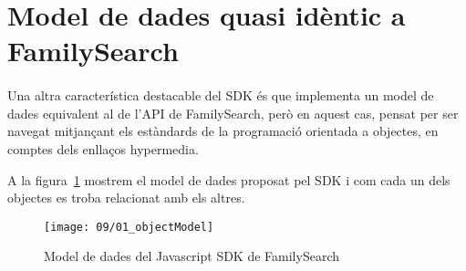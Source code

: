 \section{Model de dades quasi idèntic a FamilySearch}

    \paragraph{}
    Una altra característica destacable del SDK és que implementa un model de dades equivalent al de l’API de FamilySearch, però en aquest cas, pensat per ser navegat mitjançant els estàndards de la programació orientada a objectes, en comptes dels enllaços hypermedia.

    A la figura~\ref{fig:sdkDataModel} mostrem el model de dades proposat pel SDK i com cada un dels objectes es troba relacionat amb els altres.

    \begin{figure}[h]
        \texttt{[image: 09/01\_objectModel]}
        \centering
        \caption{Model de dades del Javascript SDK de FamilySearch}\label{fig:sdkDataModel}
    \end{figure}
